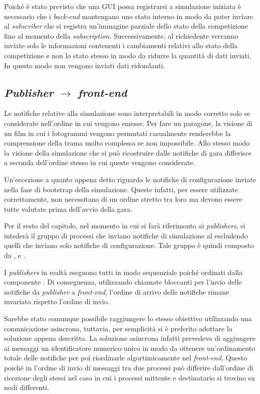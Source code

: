 Poiché è stato previsto che una GUI possa registrarsi a simulazione iniziata è necessario che i \textit{back-end} mantengano uno stato interno in modo da poter inviare al \textit{subscriber} che si registra un'immagine parziale dello stato della competizione fino al momento della \textit{subscription}. Successivamente, al richiedente verranno inviate solo le informazioni contenenti i cambiamenti relativi allo stato della competizione e non lo stato stesso in modo da ridurre la quantità di dati inviati. In questo modo non vengono inviati dati ridondanti.

\subsection*{\textit{Publisher} $\rightarrow$ \textit{front-end}}
Le notifiche relative alla simulazione sono interpretabili in modo corretto solo se considerate nell'ordine in cui vengono emesse.
Per fare un paragone, la visione di un film in cui i fotogrammi vengono permutati casualmente renderebbe la comprensione della trama molto complessa se non impossibile. Allo stesso modo la visione della simulazione che si può ricostruire dalle notifiche di gara differisce a seconda dell'ordine stesso in cui queste vengono considerate.

Un'eccezione a quanto appena detto riguarda le notifiche di configurazione inviate nella fase di bootstrap della simulazione. Queste infatti, per essere utilizzate correttamente, non necessitano di un ordine stretto tra loro ma devono essere tutte valutate prima dell'avvio della gara.

Per il resto del capitolo, nel momento in cui si farà riferimento ai \textit{publishers}, si intederà il gruppo di processi che inviano notifiche di simulazione al \evdisp{} escludendo quelli che inviano solo notifiche di configurazione. Tale gruppo è quindi composto da \sched{}, \evdisp{} e \car{}.

I \textit{publishers} in realtà eseguono tutti in modo sequenziale poiché ordinati dalla componente \sched{}. Di conseguenza, utilizzando chiamate bloccanti per l'invio delle notifiche da \textit{publisher} a \textit{front-end}, l'ordine di arrivo delle notifiche rimane invariato rispetto l'ordine di invio.

Sarebbe stato comunque possibile raggiungere lo stesso obiettivo utilizzando una comunicazione asincrona, tuttavia, per semplicità si è preferito adottare la soluzione appena descritta. La soluzione asincrona infatti prevedeva di aggiungere ai messaggi un identificatore numerico unico in modo da ottenere un'ordinamento totale delle notifiche per poi riordinarle algortimicamente nel \textit{front-end}. Questo poiché in \Erlang{} l'ordine di invio di messaggi tra due processi può differire dall'ordine di ricezione degli stessi nel caso in cui i processi mittente e destinatario si trovino su nodi differenti.

